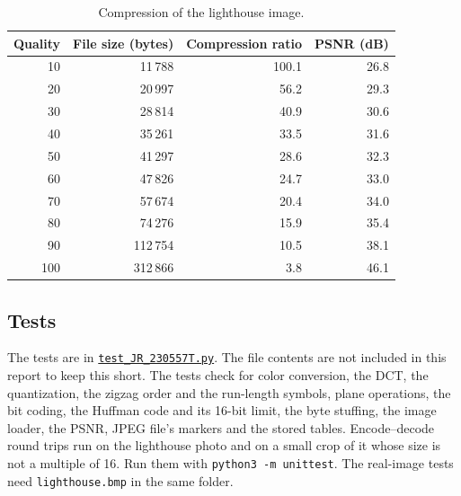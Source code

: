 \documentclass[11pt,a4paper]{article}
\begin{document}
\begin{table}[h]
\centering
\begin{tabular}{rrrr}
Quality & File size (bytes) & Compression ratio & PSNR (dB) \\
\hline
10 & 11\,788 & 100.1 & 26.8 \\
20 & 20\,997 & 56.2 & 29.3 \\
30 & 28\,814 & 40.9 & 30.6 \\
40 & 35\,261 & 33.5 & 31.6 \\
50 & 41\,297 & 28.6 & 32.3 \\
60 & 47\,826 & 24.7 & 33.0 \\
70 & 57\,674 & 20.4 & 34.0 \\
80 & 74\,276 & 15.9 & 35.4 \\
90 & 112\,754 & 10.5 & 38.1 \\
100 & 312\,866 & 3.8 & 46.1
\end{tabular}
\caption{Compression of the lighthouse image.}
\label{tab:results}
\end{table}

\subsection{Tests}

The tests are in \href{https://github.com/sahithyandev/labs/tree/main/s5/image-processing/jpeg-compression/test_JR_230557T.py}{\texttt{test\_JR\_230557T.py}}. The file contents are not included in this report to keep this short. The tests check for color conversion, the DCT, the quantization, the zigzag order and the run-length symbols, plane operations, the bit coding, the Huffman code and its 16-bit limit, the byte stuffing, the image loader, the PSNR, JPEG file's markers and the stored tables. Encode--decode round trips run on the lighthouse photo and on a small crop of it whose size is not a multiple of 16. Run them with \texttt{python3 -m unittest}. The real-image tests need \texttt{lighthouse.bmp} in the same folder.
\end{document}

